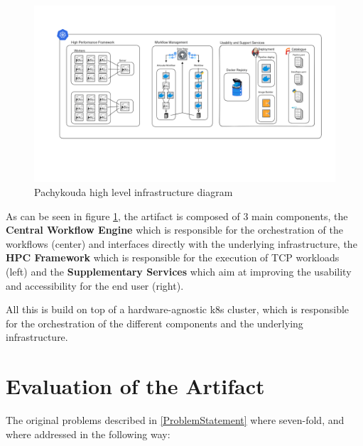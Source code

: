 \begin{figure}[htb]
    \centering
    \includegraphics[width=16cm]{graphics/pachykouda_three_aspects.png}
    \caption[Pachykouda high level diagram showing three main aspects]{Pachykouda high level infrastructure diagram}
    \label{abb:pachykouda_three_aspects}
\end{figure}


As can be seen in figure \ref{abb:pachykouda_three_aspects}, the artifact is composed of 3 main components, 
the \textbf{Central Workflow Engine} which is responsible for the orchestration of the workflows (center) and interfaces directly with the underlying infrastructure,
the \textbf{\ac{HPC} Framework} which is responsible for the execution of \ac{TCP} workloads (left)
and the \textbf{Supplementary Services} which aim at improving the usability and accessibility for the end user (right).

All this is build on top of a hardware-agnostic \ac{k8s} cluster, which is responsible for the orchestration of the different components and the underlying infrastructure.

\newpage






\newpage
\section{Evaluation of the Artifact}


The original problems described in \ref{ProblemStatement} where seven-fold, and where addressed in the following way:

